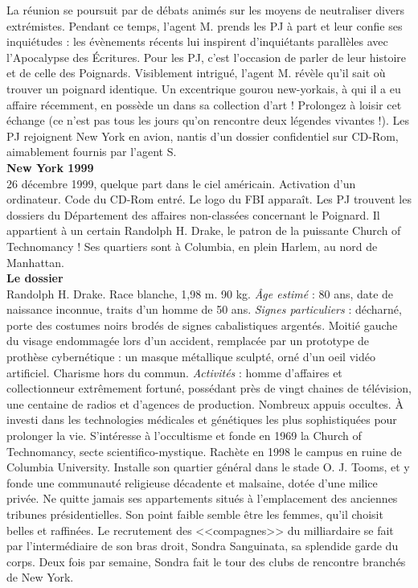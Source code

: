 \documentclass[11pt,twoside,a4paper]{book}
\begin{document}
La r{\'e}union se poursuit par de d{\'e}bats anim{\'e}s sur les moyens de neutraliser divers extr{\'e}mistes. Pendant ce temps, l'agent M. prends les PJ {\`a} part et leur confie ses inqui{\'e}tudes : les {\'e}v{\`e}nements r{\'e}cents lui inspirent d'inqui{\'e}tants parall{\`e}les avec l'Apocalypse des {\'E}critures. Pour les PJ, c'est l'occasion de parler de leur histoire et de celle des Poignards. Visiblement intrigu{\'e}, l'agent M. r{\'e}v{\`e}le qu'il sait o{\`u} trouver un poignard identique. Un excentrique gourou new-yorkais, {\`a} qui il a eu affaire r{\'e}cemment, en poss{\`e}de un dans sa collection d'art ! Prolongez {\`a} loisir cet {\'e}change (ce n'est pas tous les jours qu'on rencontre deux l{\'e}gendes vivantes !). Les PJ rejoignent New York en avion, nantis d'un dossier confidentiel sur CD-Rom, aimablement fournis par l'agent S.~\\

\textbf{\large New York 1999}~\\

26 d{\'e}cembre 1999, quelque part dans le ciel am{\'e}ricain. Activation d'un ordinateur. Code du CD-Rom entr{\'e}. Le logo du FBI appara{\^i}t. Les PJ trouvent les dossiers du D{\'e}partement des affaires non-class{\'e}es concernant le Poignard. Il appartient {\`a} un certain Randolph H. Drake, le patron de la puissante Church of Technomancy ! Ses quartiers sont {\`a} Columbia, en plein Harlem, au nord de Manhattan.~\\

\textbf{Le dossier}~\\

Randolph H. Drake. Race blanche, 1,98 m. 90 kg. \emph{{\^A}ge estim{\'e}} : 80 ans, date de naissance inconnue, traits d'un homme de 50 ans. \emph{Signes particuliers} : d{\'e}charn{\'e}, porte des costumes noirs brod{\'e}s de signes cabalistiques argent{\'e}s. Moiti{\'e} gauche du visage endommag{\'e}e lors d'un accident, remplac{\'e}e par un prototype de proth{\`e}se cybern{\'e}tique : un masque m{\'e}tallique sculpt{\'e}, orn{\'e} d'un oeil vid{\'e}o artificiel. Charisme hors du commun. \emph{Activit{\'e}s} : homme d'affaires et collectionneur extr{\^e}mement fortun{\'e}, poss{\'e}dant pr{\`e}s de vingt chaines de t{\'e}l{\'e}vision, une centaine de radios et d'agences de production. Nombreux appuis occultes. {\`A} investi dans les technologies m{\'e}dicales et g{\'e}n{\'e}tiques les plus sophistiqu{\'e}es pour prolonger la vie. S'int{\'e}resse {\`a} l'occultisme et fonde en 1969 la Church of Technomancy, secte scientifico-mystique. Rach{\`e}te en 1998 le campus en ruine de Columbia University. Installe son quartier g{\'e}n{\'e}ral dans le stade O. J. Tooms, et y fonde une communaut{\'e} religieuse d{\'e}cadente et malsaine, dot{\'e}e d'une milice priv{\'e}e. Ne quitte jamais ses appartements situ{\'e}s {\`a} l'emplacement des anciennes tribunes pr{\'e}sidentielles. Son point faible semble {\^e}tre les femmes, qu'il choisit belles et raffin{\'e}es. Le recrutement des <<compagnes>> du milliardaire se fait par l'interm{\'e}diaire de son bras droit, Sondra Sanguinata, sa splendide garde du corps. Deux fois par semaine, Sondra fait le tour des clubs de rencontre branch{\'e}s de New York.~\\
\end{document}
